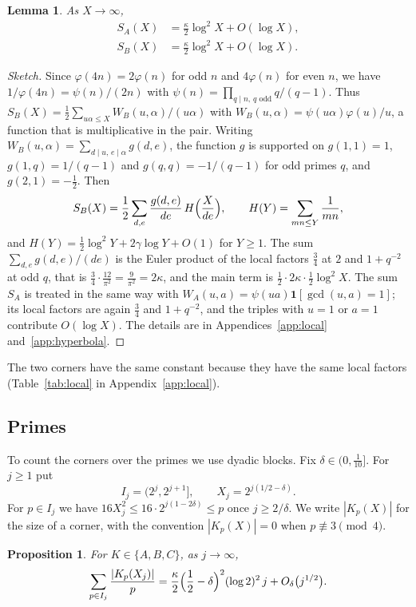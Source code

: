 \documentclass[aps,prd,twocolumn,superscriptaddress,nofootinbib,longbibliography,floatfix,showkeys,nobalancelastpage,amsmath,amssymb,10pt]{revtex4-2}
\theoremstyle{plain}
\newtheorem{proposition}[theorem]{Proposition}
\newtheorem{lemma}[theorem]{Lemma}
\theoremstyle{definition}
\theoremstyle{plain}
\newcommand{\one}{\mathbf{1}}
\begin{document}
\begin{lemma}\label{lem:mean}
As $X\to\infty$,
\begin{align*}
S_A(X)&=\frac\kappa2\log^2X+O(\log X),\\
S_B(X)&=\frac\kappa2\log^2X+O(\log X).
\end{align*}
\end{lemma}

\begin{proof}[Sketch]
Since $\varphi(4n)=2\varphi(n)$ for odd $n$ and $4\varphi(n)$ for even $n$, we have $1/\varphi(4n)=\psi(n)/(2n)$ with $\psi(n)=\prod_{q\mid n,\,q\text{ odd}}q/(q-1)$. Thus $S_B(X)=\frac12\sum_{u\alpha\le X}W_B(u,\alpha)/(u\alpha)$ with $W_B(u,\alpha)=\psi(u\alpha)\varphi(u)/u$, a function that is multiplicative in the pair. Writing $W_B(u,\alpha)=\sum_{d\mid u,\,e\mid\alpha}g(d,e)$, the function $g$ is supported on $g(1,1)=1$, $g(1,q)=1/(q-1)$ and $g(q,q)=-1/(q-1)$ for odd primes $q$, and $g(2,1)=-\frac12$. Then
\[
S_B(X)=\frac12\sum_{d,e}\frac{g(d,e)}{de}\,H\Bigl(\frac X{de}\Bigr),\qquad H(Y)=\sum_{mn\le Y}\frac1{mn},
\]
and $H(Y)=\frac12\log^2Y+2\gamma\log Y+O(1)$ for $Y\ge1$. The sum $\sum_{d,e}g(d,e)/(de)$ is the Euler product of the local factors $\frac34$ at $2$ and $1+q^{-2}$ at odd $q$, that is $\frac34\cdot\frac{12}{\pi^2}=\frac9{\pi^2}=2\kappa$, and the main term is $\frac12\cdot2\kappa\cdot\frac12\log^2X$. The sum $S_A$ is treated in the same way with $W_A(u,a)=\psi(ua)\one[\gcd(u,a)=1]$; its local factors are again $\frac34$ and $1+q^{-2}$, and the triples with $u=1$ or $a=1$ contribute $O(\log X)$. The details are in Appendices~\ref{app:local} and~\ref{app:hyperbola}.
\end{proof}

The two corners have the same constant because they have the same local factors (Table~\ref{tab:local} in Appendix~\ref{app:local}).

\subsection{Primes}

To count the corners over the primes we use dyadic blocks. Fix $\delta\in(0,\frac1{10}]$. For $j\ge1$ put
\[
I_j=(2^j,2^{j+1}],\qquad X_j=2^{j(1/2-\delta)}.
\]
For $p\in I_j$ we have $16X_j^2\le16\cdot2^{j(1-2\delta)}\le p$ once $j\ge2/\delta$. We write $|K_p(X)|$ for the size of a corner, with the convention $|K_p(X)|=0$ when $p\not\equiv3\pmod4$.

\begin{proposition}\label{prop:primes}
For $K\in\{A,B,C\}$, as $j\to\infty$,
\[
\sum_{p\in I_j}\frac{|K_p(X_j)|}{p}=\frac\kappa2\Bigl(\frac12-\delta\Bigr)^2(\log2)^2\,j+O_\delta\bigl(j^{1/2}\bigr).
\]
\end{proposition}
\end{document}
